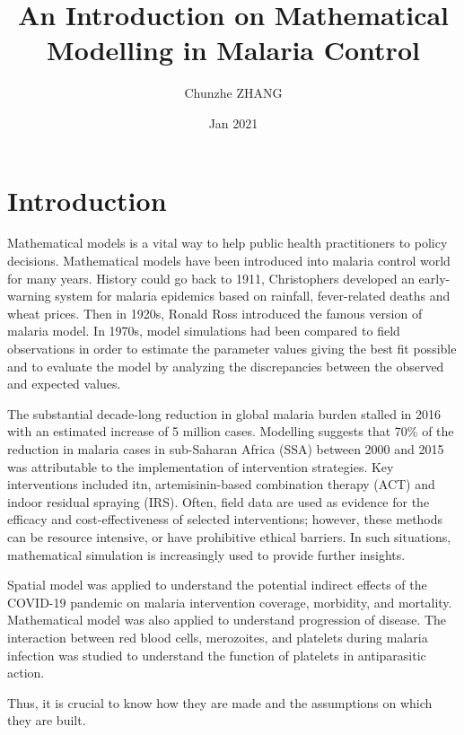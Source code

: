 \documentclass[a4paper, 12pt, twoside]{article}
\title{An Introduction on Mathematical Modelling in Malaria Control}
\author{Chunzhe ZHANG}
\date{Jan 2021}
\begin{document}
\begin{titlepage}
	\maketitle
\end{titlepage}

\tableofcontents

\section{Introduction}
Mathematical models is a vital way to help public health practitioners to policy decisions.
Mathematical models have been introduced into malaria control world for many years.
History could go back to 1911, Christophers\cite{christophers1911epidemic} developed an early-warning system for malaria epidemics based on rainfall, fever-related deaths and wheat prices.
Then in 1920s, Ronald Ross introduced the famous version of malaria model.
In 1970s, model simulations had been compared to field observations in order to estimate the parameter values giving the best fit possible and to evaluate the model by analyzing the discrepancies between the observed and expected values\cite{dietz1974}.

The substantial decade-long reduction in global malaria burden stalled in 2016 with an estimated increase of 5 million cases.
Modelling suggests that 70\% of the reduction in malaria cases in sub-Saharan Africa (SSA) between 2000 and 2015 was attributable to the implementation of intervention strategies.
Key interventions included \gls{itn}, artemisinin-based combination therapy (ACT) and indoor residual spraying (IRS).
Often, field data are used as evidence for the efficacy and cost-effectiveness of selected interventions; however, these methods can be resource intensive, or have prohibitive ethical barriers.
In such situations, mathematical simulation is increasingly used to provide further insights.

Spatial model\cite{Weiss2020e} was applied to understand the potential indirect effects of the COVID-19 pandemic on malaria intervention coverage, morbidity, and mortality.
Mathematical model was also applied to understand progression of disease. The interaction between red blood cells, merozoites, and platelets during malaria infection was studied to understand the function of platelets in antiparasitic action.

Thus, it is crucial to know how they are made and the assumptions on which they are built.
\end{document}
